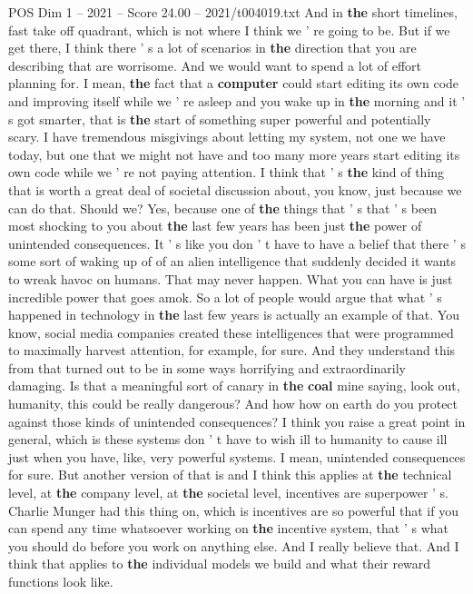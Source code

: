 \begin{textsample}{POS Dim 1 – 2021 – Score 24.00 – 2021/t004019.txt}
And in \textbf{the} short timelines, fast take off quadrant, which is not where I think we ' re going to be.
But if we get there, I think there ' s a lot of scenarios in \textbf{the} direction that you are describing that are worrisome.
And we would want to spend a lot of effort planning for.
I mean, \textbf{the} fact that a \textbf{computer} could start editing its own code and improving itself while we ' re asleep and you wake up in \textbf{the} morning and it ' s got smarter, that is \textbf{the} start of something super powerful and potentially scary.
I have tremendous misgivings about letting my system, not one we have today, but one that we might not have and too many more years start editing its own code while we ' re not paying attention.
I think that ' s \textbf{the} kind of thing that is worth a great deal of societal discussion about, you know, just because we can do that.
Should we?
Yes, because one of \textbf{the} things that ' s that ' s been most shocking to you about \textbf{the} last few years has been just \textbf{the} power of unintended consequences.
It ' s like you don ' t have to have a belief that there ' s some sort of waking up of of an alien intelligence that suddenly decided it wants to wreak havoc on humans.
That may never happen.
What you can have is just incredible power that goes amok.
So a lot of people would argue that what ' s happened in technology in \textbf{the} last few years is actually an example of that.
You know, social media companies created these intelligences that were programmed to maximally harvest attention, for example, for sure.
And they understand this from that turned out to be in some ways horrifying and extraordinarily damaging.
Is that a meaningful sort of canary in \textbf{the} \textbf{coal} mine saying, look out, humanity, this could be really dangerous?
And how how on earth do you protect against those kinds of unintended consequences?
I think you raise a great point in general, which is these systems don ' t have to wish ill to humanity to cause ill just when you have, like, very powerful systems.
I mean, unintended consequences for sure.
But another version of that is and I think this applies at \textbf{the} technical level, at \textbf{the} company level, at \textbf{the} societal level, incentives are superpower ' s.
Charlie Munger had this thing on, which is incentives are so powerful that if you can spend any time whatsoever working on \textbf{the} incentive system, that ' s what you should do before you work on anything else.
And I really believe that.
And I think that applies to \textbf{the} individual models we build and what their reward functions look like.

\end{textsample}
